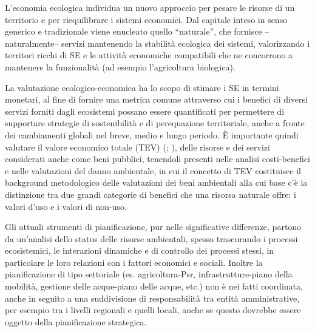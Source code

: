 \documentclass[12pt,a4paper]{article}
\begin{document}
	L'economia ecologica individua un nuovo approccio per pesare le risorse di un territorio e per riequilibrare i sistemi economici. Dal capitale inteso in senso generico e tradizionale viene enucleato quello ``naturale'', che fornisce --naturalmente-- servizi mantenendo la stabilità ecologica dei sistemi, valorizzando i territori ricchi di SE e le attività economiche compatibili che ne concorrono a mantenere la funzionalità (ad esempio l'agricoltura biologica). 
	
	La valutazione ecologico-economica ha lo scopo di stimare i SE in termini monetari, al fine di fornire una metrica comune	attraverso cui i benefici di diversi servizi forniti dagli ecosistemi possano essere quantificati \cite{MEA_EcosystemsAndHumanWellBeing:Synthesis} per permettere di supportare strategie di sostenibilità e di perequazione territoriale, anche a fronte dei cambiamenti globali nel breve, medio e lungo periodo. È importante quindi valutare il valore economico totale (TEV) (\cite{freeman2014measurement}; \cite{merlo2005valuing}), delle risorse e dei servizi considerati anche come beni pubblici, tenendoli presenti nelle analisi costi-benefici e nelle valutazioni del danno ambientale, in cui il concetto di TEV costituisce il background metodologico delle valutazioni dei beni ambientali alla cui base c'è la distinzione tra due grandi categorie di benefici che una risorsa naturale offre: i valori d'uso e i valori di non-uso.  
	
	
	Gli attuali strumenti di pianificazione, pur nelle significative differenze, partono da un'analisi dello status delle risorse ambientali, spesso trascurando i processi ecosistemici, le interazioni dinamiche e di controllo dei processi stessi, in particolare le loro relazioni con i fattori economici e sociali. Inoltre la pianificazione di tipo settoriale (es. agricoltura-Psr, infrastrutture-piano della mobilità, gestione delle acque-piano delle acque, etc.) non è nei fatti coordinata, anche in seguito a una suddivisione di responsabilità tra entità amministrative, per esempio tra i livelli regionali e quelli 	locali, anche se questo dovrebbe essere oggetto della pianificazione strategica. 
	
\end{document}
